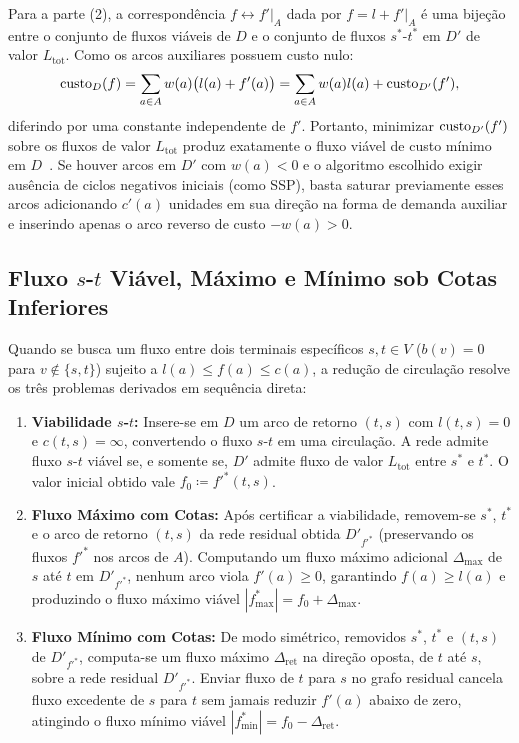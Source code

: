 \begin{demonstracao}
Para a parte (2), a correspondência $f \leftrightarrow f'|_A$ dada por $f = l + f'|_A$ é uma bijeção entre o conjunto de fluxos viáveis de $D$ e o conjunto de fluxos $s^*$-$t^*$ em $D'$ de valor $L_{\text{tot}}$. Como os arcos auxiliares possuem custo nulo:
\begin{equation*}
    \operatorname{custo}_D(f) = \sum_{a \in A} w(a) \bigl(l(a) + f'(a)\bigr) = \sum_{a \in A} w(a) l(a) + \operatorname{custo}_{D'}(f'),
\end{equation*}
diferindo por uma constante independente de $f'$. Portanto, minimizar $\operatorname{custo}_{D'}(f')$ sobre os fluxos de valor $L_{\text{tot}}$ produz exatamente o fluxo viável de custo mínimo em $D$~\cite{ahuja1993network, schrijver2003combinatorial}. Se houver arcos em $D'$ com $w(a) < 0$ e o algoritmo escolhido exigir ausência de ciclos negativos iniciais (como SSP), basta saturar previamente esses arcos adicionando $c'(a)$ unidades em sua direção na forma de demanda auxiliar e inserindo apenas o arco reverso de custo $-w(a) > 0$.
\end{demonstracao}


\subsection{Fluxo \texorpdfstring{$s$-$t$}{s-t} Viável, Máximo e Mínimo sob Cotas Inferiores}\label{sec:fluxo_st_cotas}

Quando se busca um fluxo entre dois terminais específicos $s, t \in V$ ($b(v) = 0$ para $v \notin \{s, t\}$) sujeito a $l(a) \le f(a) \le c(a)$, a redução de circulação resolve os três problemas derivados em sequência direta:
\begin{enumerate}
    \item \textbf{Viabilidade $s$-$t$:} Insere-se em $D$ um arco de retorno $(t, s)$ com $l(t, s) = 0$ e $c(t, s) = \infty$, convertendo o fluxo $s$-$t$ em uma circulação. A rede admite fluxo $s$-$t$ viável se, e somente se, $D'$ admite fluxo de valor $L_{\text{tot}}$ entre $s^*$ e $t^*$. O valor inicial obtido vale $f_0 \coloneqq f'^*(t, s)$.
    \item \textbf{Fluxo Máximo com Cotas:} Após certificar a viabilidade, removem-se $s^*$, $t^*$ e o arco de retorno $(t, s)$ da rede residual obtida $D'_{f'^*}$ (preservando os fluxos $f'^*$ nos arcos de $A$). Computando um fluxo máximo adicional $\Delta_{\max}$ de $s$ até $t$ em $D'_{f'^*}$, nenhum arco viola $f'(a) \ge 0$, garantindo $f(a) \ge l(a)$ e produzindo o fluxo máximo viável $|f^*_{\max}| = f_0 + \Delta_{\max}$.
    \item \textbf{Fluxo Mínimo com Cotas:} De modo simétrico, removidos $s^*$, $t^*$ e $(t, s)$ de $D'_{f'^*}$, computa-se um fluxo máximo $\Delta_{\text{ret}}$ na direção oposta, de $t$ até $s$, sobre a rede residual $D'_{f'^*}$. Enviar fluxo de $t$ para $s$ no grafo residual cancela fluxo excedente de $s$ para $t$ sem jamais reduzir $f'(a)$ abaixo de zero, atingindo o fluxo mínimo viável $|f^*_{\min}| = f_0 - \Delta_{\text{ret}}$.
\end{enumerate}

